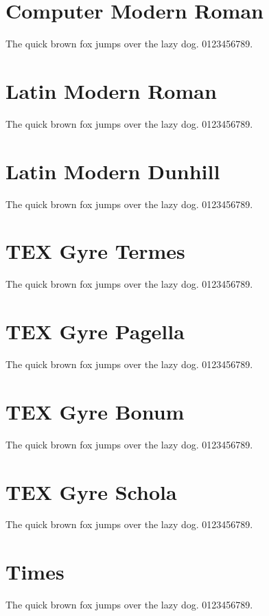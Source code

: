 \documentclass{article}
\begin{document}

\section{Computer Modern Roman}
{   \selectfont The quick brown fox jumps over the lazy dog. 0123456789.}

\section{Latin Modern Roman}
{   \selectfont The quick brown fox jumps over the lazy dog. 0123456789.}

\section{Latin Modern Dunhill}
{  \selectfont The quick brown fox jumps over the lazy dog. 0123456789.}

\section{TEX Gyre Termes}
{   \selectfont The quick brown fox jumps over the lazy dog. 0123456789.}

\section{TEX Gyre Pagella}
{   \selectfont The quick brown fox jumps over the lazy dog. 0123456789.}

\section{TEX Gyre Bonum}
{   \selectfont The quick brown fox jumps over the lazy dog. 0123456789.}

\section{TEX Gyre Schola}
{   \selectfont The quick brown fox jumps over the lazy dog. 0123456789.}

\section{Times}
{   \selectfont The quick brown fox jumps over the lazy dog. 0123456789.}
\end{document}
